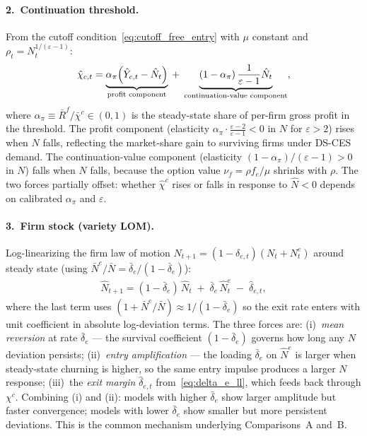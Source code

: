 \documentclass[authoryear, review, 12pt]{elsarticle}
\begin{document}
\paragraph{2.\ Continuation threshold.}
From the cutoff condition~\eqref{eq:cutoff_free_entry} with $\mu$ constant
and $\rho_t = N_t^{1/(\varepsilon-1)}$:
\begin{align}\label{eq:xc_ll}
    \hat\chi_{c,t}
    = \underbrace{\alpha_\pi\Bigl(\hat{Y}_{c,t} - \hat{N}_t\Bigr)}_{\text{profit component}}
    \;+\; \underbrace{(1-\alpha_\pi)\,\frac{1}{\varepsilon-1}\hat{N}_t}_{\text{continuation-value component}},
\end{align}
where $\alpha_\pi \equiv \bar{R}^f/\bar\chi^c \in(0,1)$ is the steady-state
share of per-firm gross profit in the threshold.  The profit component
(elasticity $\alpha_\pi\cdot\frac{\varepsilon-2}{\varepsilon-1} < 0$ in $N$
for $\varepsilon>2$) rises when $N$ falls, reflecting the market-share gain
to surviving firms under DS-CES demand.  The continuation-value component
(elasticity $(1-\alpha_\pi)/(\varepsilon-1) > 0$ in $N$) falls when $N$
falls, because the option value $\nu_f = \rho f_e/\mu$ shrinks with $\rho$.
The two forces partially offset: whether $\hat\chi^c$ rises or falls in
response to $\hat{N}<0$ depends on calibrated $\alpha_\pi$ and $\varepsilon$.

\paragraph{3.\ Firm stock (variety LOM).}
Log-linearizing the firm law of motion $N_{t+1}=(1-\delta_{e,t})(N_t+N_t^e)$
around steady state (using $\bar{N}^e/\bar{N}=\bar\delta_e/(1-\bar\delta_e)$):
\begin{align}\label{eq:N_lom_ll2}
    \hat{N}_{t+1}
    = (1-\bar\delta_e)\,\hat{N}_t
    \;+\; \bar\delta_e\,\hat{N}_t^e
    \;-\; \hat{\delta}_{e,t},
\end{align}
where the last term uses $(1+\bar{N}^e/\bar{N})\approx1/(1-\bar\delta_e)$ so
the exit rate enters with unit coefficient in absolute log-deviation terms.
The three forces are: (i)~\emph{mean reversion} at rate $\bar\delta_e$ — the
survival coefficient $(1-\bar\delta_e)$ governs how long any $N$ deviation
persists; (ii)~\emph{entry amplification} — the loading $\bar\delta_e$ on
$\hat{N}^e$ is larger when steady-state churning is higher, so the same
entry impulse produces a larger $N$ response; (iii)~the \emph{exit margin}
$\hat\delta_{e,t}$ from~\eqref{eq:delta_e_ll}, which feeds back through $\chi^c$.
Combining (i) and (ii): models with higher $\bar\delta_e$ show larger
amplitude but faster convergence; models with lower $\bar\delta_e$ show
smaller but more persistent deviations.  This is the common mechanism
underlying Comparisons~A and~B.
\end{document}
